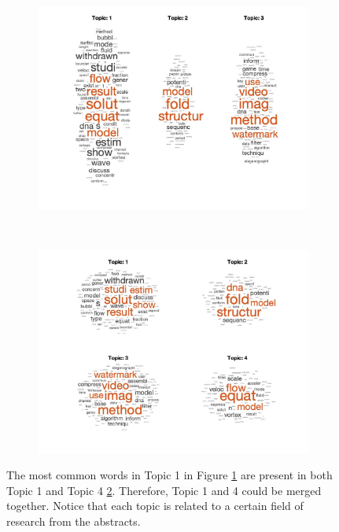 \documentclass[12pt]{article}
\begin{document}
\begin{figure}[h]
	\centering
	\begin{subfigure}{0.4\textwidth}
		\includegraphics[width=\textwidth]{images/MAP/wordcloud_MAP3_topics.jpg}
		\caption{}
		\label{fig:cloud_3}
	\end{subfigure}
	~	
	\begin{subfigure}{0.4\textwidth}
		\includegraphics[width=\textwidth]{images/MAP/wordcloud_MAP4_topics.jpg}
		\caption{}
		\label{fig:cloud_4}
	\end{subfigure}
	\caption{The most common words in Topic 1 in Figure \ref{fig:cloud_3} are present in both Topic 1 and Topic 4 \ref{fig:cloud_4}. Therefore, Topic 1 and 4 could be merged together. Notice that each topic is related to a certain field of research from the abstracts.}
	\label{fig:clouds}
\end{figure}
\end{document}
